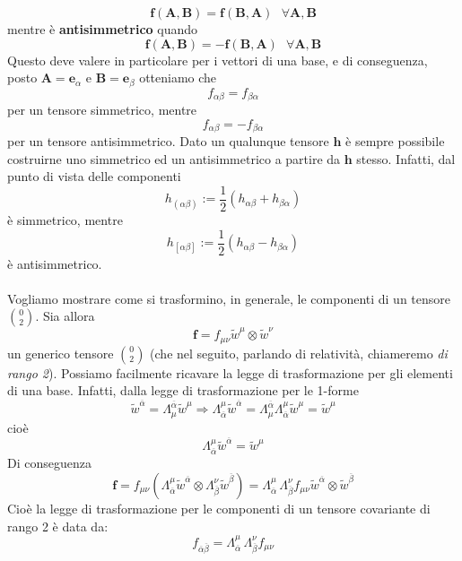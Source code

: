 \documentclass[a4paper,11pt]{book}
\theoremstyle{plain}
\theoremstyle{definition}
\begin{document}
\[
\textbf{f}(\textbf{A},\textbf{B}) = \textbf{f}(\textbf{B},\textbf{A}) \text{ } \forall \textbf{A},\textbf{B}
\]
mentre è \textbf{antisimmetrico} quando
\[
\textbf{f}(\textbf{A},\textbf{B}) = -\textbf{f}(\textbf{B},\textbf{A}) \text{ } \forall \textbf{A},\textbf{B}
\]
Questo deve valere in particolare per i vettori di una base, e di conseguenza, posto $\textbf{A}=\textbf{e}_{\alpha}$ e $\textbf{B}=\textbf{e}_{\beta}$ otteniamo che
\[
f_{\alpha\beta}=f_{\beta\alpha}
\]
per un tensore simmetrico, mentre
\[
f_{\alpha\beta}=-f_{\beta\alpha}
\]
per un tensore antisimmetrico. Dato un qualunque tensore $\textbf{h}$ è sempre possibile costruirne uno simmetrico ed un antisimmetrico a partire da $\textbf{h}$ stesso. Infatti, dal punto di vista delle componenti
\[
h_{(\alpha\beta)}:=\frac{1}{2}(h_{\alpha\beta}+h_{\beta\alpha})
\]
è simmetrico, mentre
\[
h_{[\alpha\beta]}:=\frac{1}{2}(h_{\alpha\beta}-h_{\beta\alpha})
\]
è antisimmetrico. \\
\\
Vogliamo mostrare come si trasformino, in generale, le componenti di un tensore $\binom{0}{2}$. Sia allora 
\[
\textbf{f} = f_{\mu\nu}\tilde{w}^{\mu}\otimes \tilde{w}^{\nu}
\]
un generico tensore $\binom{0}{2}$ (che nel seguito, parlando di relatività, chiameremo \emph{di rango 2}). Possiamo facilmente ricavare la legge di trasformazione per gli elementi di una base. Infatti, dalla legge di trasformazione per le 1-forme
\[
\tilde{w}^{\overline{\alpha}} = \Lambda_{\mu}^{\overline{\alpha}}\tilde{w}^{\mu} \Longrightarrow \Lambda_{\overline{\alpha}}^{\mu}\tilde{w}^{\overline{\alpha}} = \Lambda_{\mu}^{\overline{\alpha}}\Lambda_{\overline{\alpha}}^{\mu}\tilde{w}^{\mu} = \tilde{w}^{\mu}
\]
cioè 
\[
\Lambda_{\overline{\alpha}}^{\mu}\tilde{w}^{\overline{\alpha}} = \tilde{w}^{\mu}
\]
Di conseguenza
\[
\textbf{f} = f_{\mu\nu} ( \Lambda_{\overline{\alpha}}^{\mu}\tilde{w}^{\overline{\alpha}} \otimes \Lambda_{\overline{\beta}}^{\nu}\tilde{w}^{\overline{\beta}}) = \Lambda_{\overline{\alpha}}^{\mu}\,\Lambda_{\overline{\beta}}^{\nu} f_{\mu\nu} \tilde{w}^{\overline{\alpha}} \otimes \tilde{w}^{\overline{\beta}}
\]
Cioè la legge di trasformazione per le componenti di un tensore covariante di rango 2 è data da:
\begin{equation}\label{eq:covariant}
f_{\overline{\alpha}\overline{\beta}} = \Lambda_{\overline{\alpha}}^{\mu}\,\Lambda_{\overline{\beta}}^{\nu} f_{\mu\nu}
\end{equation}
\end{document}
